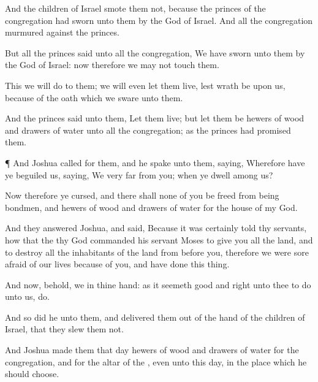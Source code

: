 {And the
children of
Israel
smote them not, because the
princes of the
congregation had
sworn unto them by the
{}
God of
Israel. And all the
congregation
murmured against the
princes.

But all the
princes
said unto all the
congregation, We have
sworn unto them by the
{}
God of
Israel: now therefore we
may not
touch them.

This we will
do to them; we will even let them
live, lest
wrath be upon us, because of the
oath which we
sware unto them.

And the
princes
said unto them, Let them
live; but let them be
hewers of
wood and
drawers of
water unto all the
congregation; as the
princes had
promised them.


\par }{\PP {}¶ And
Joshua
called for them, and he
spake unto them,
saying, Wherefore have ye
beguiled us,
saying, We
{}
very
far from you; when ye
dwell
among us?

Now therefore ye
{}
cursed, and there shall none of you be
freed from being
bondmen, and
hewers of
wood and
drawers of
water for the
house of my
God.

And they
answered
Joshua, and
said, Because it was
certainly
told thy
servants, how that the
{} thy
God
commanded his
servant
Moses to
give you all the
land, and to
destroy all the
inhabitants of the
land from
before you, therefore we were
sore
afraid of our
lives
because of you, and have
done this
thing.

And now, behold,
we
{} in thine
hand: as it
seemeth
good and
right unto thee to
do unto us,
do.

And so
did he unto them, and
delivered them out of the
hand of the
children of
Israel, that they
slew them not.

And
Joshua
made them that
day
hewers of
wood and
drawers of
water for the
congregation, and for the
altar of the
{}, even unto this
day, in the
place which he should
choose.




\par }

